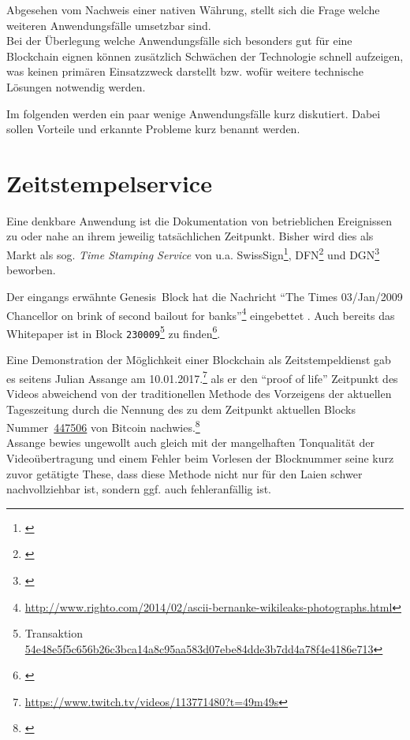 Abgesehen vom Nachweis einer nativen Währung, stellt sich die Frage welche weiteren Anwendungsfälle umsetzbar sind. \\
Bei der Überlegung welche Anwendungsfälle sich besonders gut für eine Blockchain eignen können zusätzlich Schwächen der Technologie schnell aufzeigen, was keinen primären Einsatzzweck darstellt bzw. wofür weitere technische Lösungen notwendig werden.


Im folgenden werden ein paar wenige Anwendungsfälle kurz diskutiert. Dabei sollen Vorteile und erkannte Probleme kurz benannt werden.

\section{Zeitstempelservice}

Eine denkbare Anwendung ist die Dokumentation von betrieblichen Ereignissen zu oder nahe an ihrem jeweilig tatsächlichen Zeitpunkt.
Bisher wird dies als Markt als sog. \emph{Time Stamping Service} von u.a. SwissSign\footnote{\cite{w:swisssign:timestamtservice}}, \gls{DFN}\footnote{\cite{w:dfn:timestamtservice}} und \gls{DGN}\footnote{\cite{w:dgn:timestamtservice}} beworben.

Der eingangs erwähnte Genesis~Block hat die Nachricht \enquote{The Times 03/Jan/2009 Chancellor on brink of second bailout for banks}\footnote{\url{http://www.righto.com/2014/02/ascii-bernanke-wikileaks-photographs.html}} eingebettet%
. Auch bereits das Whitepaper \autocite{p:bitcoin} ist in Block \texttt{230009}\footnote{Transaktion \href{https://blockchain.info/tx/54e48e5f5c656b26c3bca14a8c95aa583d07ebe84dde3b7dd4a78f4e4186e713}{54e48e5f5c656b26c3bca14a8c95aa583d07ebe84dde3b7dd4a78f4e4186e713}} zu finden\footnote{\cite{w:bitcoin:storeddata}}.

Eine Demonstration der Möglichkeit einer Blockchain als Zeitstempeldienst gab es seitens Julian Assange am 10.01.2017.\footnote{\url{https://www.twitch.tv/videos/113771480?t=49m49s}} als er den \enquote{proof of life} Zeitpunkt des Videos abweichend von der traditionellen Methode des Vorzeigens der aktuellen Tageszeitung durch die Nennung des zu dem Zeitpunkt aktuellen Blocks Nummer~\href{https://blockchain.info/block/00000000000000000178374f687728789caa92ecb49b4d850dfc173a7c0351e6}{447506} von Bitcoin nachwies.\footnote{\cite{w:twitch:assange:timestamping}} \\
Assange bewies ungewollt auch gleich mit der mangelhaften Tonqualität der Videoübertragung und einem Fehler beim Vorlesen der Blocknummer seine kurz zuvor getätigte These, dass diese Methode nicht nur für den Laien schwer nachvollziehbar ist, sondern ggf. auch fehleranfällig ist.

